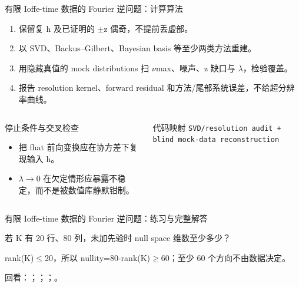 \begin{frame}[t]{有限 Ioffe-time 数据的 Fourier 逆问题：计算算法}
\footnotesize
{}\begin{enumerate}
\item 保留复 h 及已证明的 \ensuremath{\pm}z 偶奇，不提前丢虚部。
\item 以 SVD、Backus--Gilbert、Bayesian basis 等至少两类方法重建。
\item 用隐藏真值的 mock distributions 扫 \ensuremath{\nu}max、噪声、z 缺口与 \ensuremath{\lambda}，检验覆盖。
\item 报告 resolution kernel、forward residual 和方法/\allowbreak{}尾部系统误差，不给超分辨率曲线。
\end{enumerate}\begin{columns}[T,onlytextwidth]
\begin{block}{停止条件与交叉检查}\scriptsize\begin{itemize}
\item[\CheckMark] 把 fhat 前向变换应在协方差下复现输入 h。
\item[\CheckMark] \ensuremath{\lambda}\ensuremath{\rightarrow}0 在欠定情形应暴露不稳定，而不是被数值库静默钳制。
\end{itemize}\end{block}
\begin{block}{代码映射}
\scriptsize \texttt{SVD/\allowbreak{}resolution audit + blind mock-data reconstruction}
\end{block}\end{columns}\end{frame}

\begin{frame}[t]{有限 Ioffe-time 数据的 Fourier 逆问题：练习与完整解答}
\footnotesize
\begin{block}{}若 K 有 20 行、80 列，未加先验时 null space 维数至少多少？\end{block}
\begin{exampleblock}{}rank(K)\ensuremath{\le}20，所以 nullity=80-rank(K)\ensuremath{\ge}60；至少 60 个方向不由数据决定。\end{exampleblock}
\vfill
\scriptsize 回看：；；；。
\end{frame}

